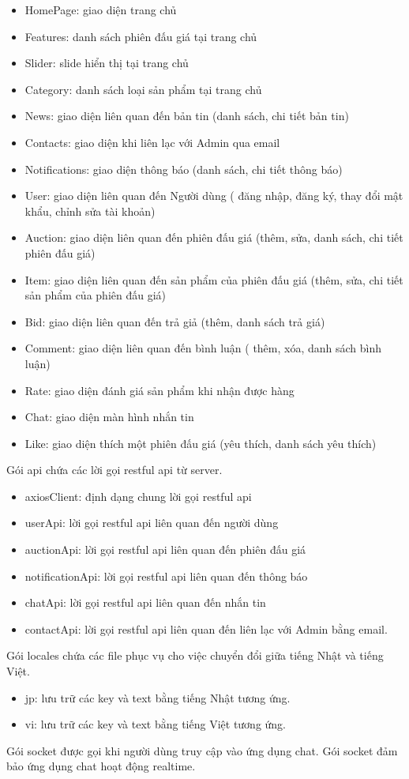 \documentclass{article}
\begin{document}
\begin{itemize}
    \item HomePage: giao diện trang chủ
    \item Features: danh sách phiên đấu giá tại trang chủ
    \item Slider: slide hiển thị tại trang chủ
    \item Category: danh sách loại sản phẩm tại trang chủ
    \item News: giao diện liên quan đến bản tin (danh sách, chi tiết bản tin)
    \item Contacts: giao diện khi liên lạc với Admin qua email
    \item Notifications: giao diện thông báo (danh sách, chi tiết thông báo)
    \item User: giao diện liên quan đến Người dùng ( đăng nhập, đăng ký, thay đổi mật khẩu, chỉnh sửa tài khoản)
    \item Auction: giao diện liên quan đến phiên đấu giá (thêm, sửa, danh sách, chi tiết phiên đấu giá)
    \item Item: giao diện liên quan đến sản phẩm của phiên đấu giá (thêm, sửa, chi tiết sản phẩm của phiên đấu giá) 
    \item Bid: giao diện liên quan đến trả giả (thêm, danh sách trả giá)
    \item Comment: giao diện liên quan đến bình luận ( thêm, xóa, danh sách bình luận)
    \item Rate: giao diện đánh giá sản phẩm khi nhận được hàng
    \item Chat: giao diện màn hình nhắn tin
    \item Like: giao diện thích một phiên đấu giá (yêu thích, danh sách yêu thích)
\end{itemize}
Gói api chứa các lời gọi restful api từ server.
\begin{itemize}
    \item axiosClient: định dạng chung lời gọi restful api
    \item userApi: lời gọi restful api liên quan đến người dùng
    \item auctionApi: lời gọi restful api liên quan đến phiên đấu giá
    \item notificationApi: lời gọi restful api liên quan đến thông báo
    \item chatApi: lời gọi restful api liên quan đến nhắn tin
    \item contactApi: lời gọi restful api liên quan đến liên lạc với Admin bằng email.
\end{itemize}
Gói locales chứa các file phục vụ cho việc chuyển đổi giữa tiếng Nhật và tiếng Việt.
\begin{itemize}
    \item jp: lưu trữ các key và text bằng tiếng Nhật tương ứng.
    \item vi: lưu trữ các key và text bằng tiếng Việt tương ứng.
\end{itemize}
Gói socket được gọi khi người dùng truy cập vào ứng dụng chat. Gói socket đảm bảo ứng dụng chat hoạt động realtime.
\end{document}
